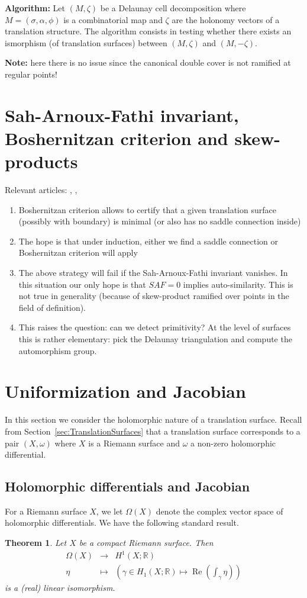 \documentclass[a4paper,12pt]{article}
\def\bR{\mathbb{R}}
\def\Re{\operatorname{Re}}
\newtheorem{theorem}[definition]{Theorem}
\begin{document}
\textbf{Algorithm:} Let $(M, \zeta)$ be a Delaunay cell decomposition where $M
= (\sigma, \alpha, \phi)$ is a combinatorial map and $\zeta$ are the holonomy
vectors of a translation structure.  The algorithm consists in testing whether
there exists an ismorphism (of translation surfaces) between $(M, \zeta)$ and
$(M, -\zeta)$.

\textbf{Note:} here there is no issue since the canonical double cover is not
ramified at regular points!

\section{Sah-Arnoux-Fathi invariant, Boshernitzan criterion and skew-products}
Relevant articles: \cite{DoSchmidt}, \cite{DynnikovSkripchenko}, \cite{Boshernitzan}

\begin{enumerate}
\item Boshernitzan criterion allows to certify that a given translation surface (possibly with boundary)
is minimal (or also has no saddle connection inside)
\item The hope is that under induction, either we find a saddle connection or Boshernitzan criterion will apply
\item The above strategy will fail if the Sah-Arnoux-Fathi invariant vanishes. In this situation our only
hope is that $SAF=0$ implies auto-similarity. This is not true in generality (because of skew-product ramified
over points in the field of definition).
\item This raises the question: can we detect primitivity? At the level of
surfaces this is rather elementary: pick the Delaunay triangulation and compute
the automorphism group.
\end{enumerate}

\section{Uniformization and Jacobian}
In this section we consider the holomorphic nature of a translation surface.
Recall from Section~\ref{sec:TranslationSurfaces} that a translation surface corresponds to a pair $(X, \omega)$ where $X$
is a Riemann surface and $\omega$ a non-zero holomorphic differential.

\subsection{Holomorphic differentials and Jacobian}
For a Riemann surface $X$, we let $\Omega(X)$ denote the complex vector space
of holomorphic differentials. We have the following standard result.
\begin{theorem}
\label{thm:HodgeCorrespondence}
Let $X$ be a compact Riemann surface. Then
\[
\begin{array}{lll}
\Omega(X) & \to & H^1(X; \bR) \\
\eta & \mapsto & \left( \gamma \in H_1(X; \bR) \mapsto \Re(\int_\gamma \eta) \right)
\end{array}
\]
is a (real) linear isomorphism.
\end{theorem}
\end{document}
